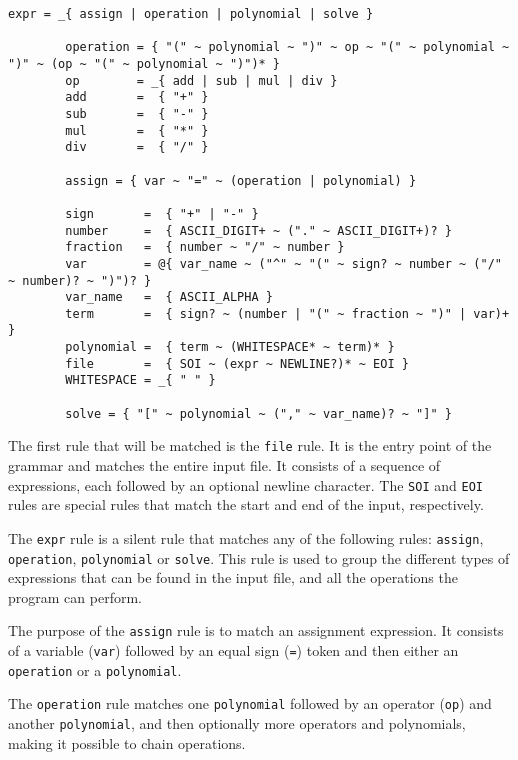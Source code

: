 \begin{minipage}{\linewidth}
    \begin{lstlisting}[caption={The grammar for Symbotini}, label={lst:grammar}]
        expr = _{ assign | operation | polynomial | solve }
        
        operation = { "(" ~ polynomial ~ ")" ~ op ~ "(" ~ polynomial ~ ")" ~ (op ~ "(" ~ polynomial ~ ")")* }
        op        = _{ add | sub | mul | div }
        add       =  { "+" }
        sub       =  { "-" }
        mul       =  { "*" }
        div       =  { "/" }
    
        assign = { var ~ "=" ~ (operation | polynomial) }
        
        sign       =  { "+" | "-" }
        number     =  { ASCII_DIGIT+ ~ ("." ~ ASCII_DIGIT+)? }
        fraction   =  { number ~ "/" ~ number }
        var        = @{ var_name ~ ("^" ~ "(" ~ sign? ~ number ~ ("/" ~ number)? ~ ")")? }
        var_name   =  { ASCII_ALPHA }
        term       =  { sign? ~ (number | "(" ~ fraction ~ ")" | var)+ }
        polynomial =  { term ~ (WHITESPACE* ~ term)* }
        file       =  { SOI ~ (expr ~ NEWLINE?)* ~ EOI }
        WHITESPACE = _{ " " }
    
        solve = { "[" ~ polynomial ~ ("," ~ var_name)? ~ "]" }
    \end{lstlisting}
\end{minipage}

The first rule that will be matched is the \verb|file| rule. It is the entry point of the grammar and matches the entire input file. It consists of a sequence of expressions, each followed by an optional newline character. The \verb|SOI| and \verb|EOI| rules are special rules that match the start and end of the input, respectively.

The \verb|expr| rule is a silent rule that matches any of the following rules: \verb|assign|, \verb|operation|, \verb|polynomial| or \verb|solve|. This rule is used to group the different types of expressions that can be found in the input file, and all the operations the program can perform.

The purpose of the \verb|assign| rule is to match an assignment expression. It consists of a variable (\verb|var|) followed by an equal sign (\verb|=|) token and then either an \verb|operation| or a \verb|polynomial|.

The \verb|operation| rule matches one \verb|polynomial| followed by an operator (\verb|op|) and another \verb|polynomial|, and then optionally more operators and polynomials, making it possible to chain operations.

